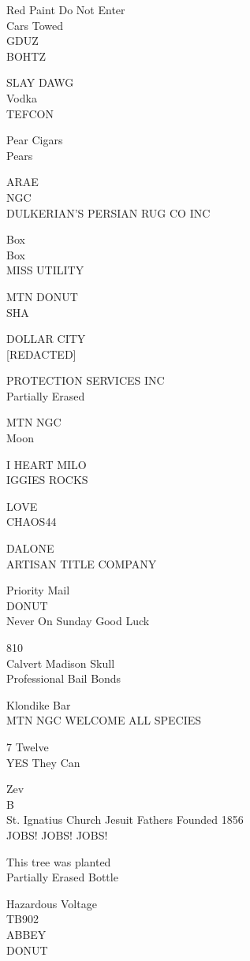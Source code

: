 \documentclass[10pt,letterpaper]{article}
\begin{document}
Red Paint Do Not Enter\\
Cars Towed\\
GDUZ\\
BOHTZ

SLAY DAWG\\
Vodka\\
TEFCON

Pear Cigars\\
Pears

ARAE\\
NGC\\
DULKERIAN'S PERSIAN RUG CO INC

Box\\
Box\\
MISS UTILITY

MTN DONUT\\
SHA

DOLLAR CITY\\
{[}REDACTED{]}

PROTECTION SERVICES INC\\
Partially Erased

MTN NGC\\
Moon

I HEART MILO\\
IGGIES ROCKS

LOVE\\
CHAOS44

DALONE\\
ARTISAN TITLE COMPANY

Priority Mail\\
DONUT\\
Never On Sunday Good Luck

810\\
Calvert Madison Skull\\
Professional Bail Bonds

Klondike Bar\\
MTN NGC WELCOME ALL SPECIES

7 Twelve\\
YES They Can

Zev\\
B\\
St. Ignatius Church Jesuit Fathers Founded 1856\\
JOBS! JOBS! JOBS!

This tree was planted\\
Partially Erased Bottle

Hazardous Voltage\\
TB902\\
ABBEY\\
DONUT
\end{document}
